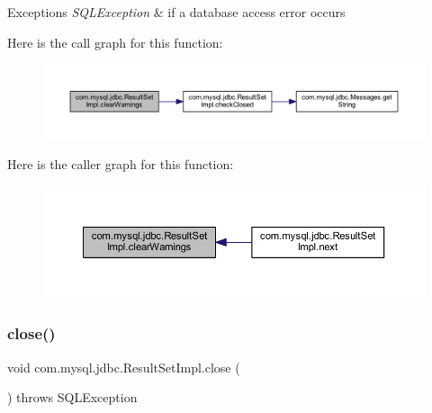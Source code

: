 \begin{DoxyExceptions}{Exceptions}
{\em S\+Q\+L\+Exception} & if a database access error occurs \\
\hline
\end{DoxyExceptions}
Here is the call graph for this function\+:
\nopagebreak
\begin{figure}[H]
\begin{center}
\leavevmode
\includegraphics[width=350pt]{classcom_1_1mysql_1_1jdbc_1_1_result_set_impl_aa7004e3cd1cfb057fb2b7e3a14802c54_cgraph}
\end{center}
\end{figure}
Here is the caller graph for this function\+:
\nopagebreak
\begin{figure}[H]
\begin{center}
\leavevmode
\includegraphics[width=350pt]{classcom_1_1mysql_1_1jdbc_1_1_result_set_impl_aa7004e3cd1cfb057fb2b7e3a14802c54_icgraph}
\end{center}
\end{figure}
\mbox{\label{classcom_1_1mysql_1_1jdbc_1_1_result_set_impl_a08b7641e8a768554093538fc9c0a4143}} 
\subsubsection{\texorpdfstring{close()}{close()}}
{\footnotesize\ttfamily void com.\+mysql.\+jdbc.\+Result\+Set\+Impl.\+close (\begin{DoxyParamCaption}{ }\end{DoxyParamCaption}) throws S\+Q\+L\+Exception}

